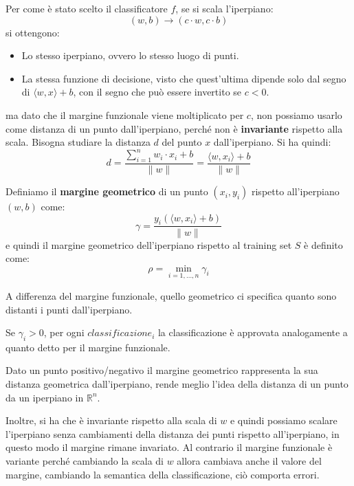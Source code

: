 Per come è stato scelto il classificatore $f$, se si scala l'iperpiano:
\begin{equation}
    (w, b) \to (c \cdot w, c\cdot b)
\end{equation}
si ottengono:
\begin{itemize}
    \item Lo stesso iperpiano, ovvero lo stesso luogo di punti.
    \item La stessa funzione di decisione, visto che quest'ultima dipende solo
          dal segno di $\langle w, x \rangle + b$, con il segno che può essere
          invertito se $c < 0$.
\end{itemize}
ma dato che il margine funzionale viene moltiplicato per $c$, non possiamo usarlo
come distanza di un punto dall'iperpiano, perché non è \textbf{invariante} rispetto
alla scala. Bisogna studiare la distanza $d$ del punto $x$ dall'iperpiano. Si ha
quindi:
\begin{equation}
    d = \frac{\sum_{i = 1} ^ n w_i \cdot x_i + b}{\| w \|} =
    \frac{\langle w, x_i \rangle + b}{\|  w \|}
\end{equation}
\begin{definizione}
    Definiamo il \textbf{margine geometrico} di un punto $(x_i, y_i)$ rispetto
    all'iperpiano $(w, b)$ come:
    \begin{equation}
        \gamma = \frac{y_i(\langle w, x_i \rangle + b)}{\| w \|}
    \end{equation}
    e quindi il margine geometrico dell'iperpiano rispetto al training set $S$ è
    definito come:
    \begin{equation}
        \rho =  \min_{i = 1, \dots, n} {\gamma}_i
    \end{equation}
\end{definizione}
A differenza del margine funzionale, quello geometrico ci specifica quanto
sono distanti i punti dall'iperpiano.
\begin{teorema}
    Se $\gamma_i > 0$, per ogni $classificazione_i$ la classificazione è approvata
    analogamente a quanto detto per il margine funzionale.
\end{teorema}
Dato un punto positivo/negativo il margine geometrico rappresenta la sua distanza
geometrica dall'iperpiano, rende meglio l'idea della distanza di un punto da un
iperpiano in $\mathbb{R}^n$.

Inoltre, si ha che è invariante rispetto alla scala di $w$ e quindi possiamo
scalare l'iperpiano senza cambiamenti della distanza dei punti rispetto
all'iperpiano, in questo modo il margine rimane invariato. Al contrario il
margine funzionale è variante perché cambiando la scala di $w$ allora cambiava
anche il valore del margine, cambiando la semantica della classificazione, ciò
comporta errori.

